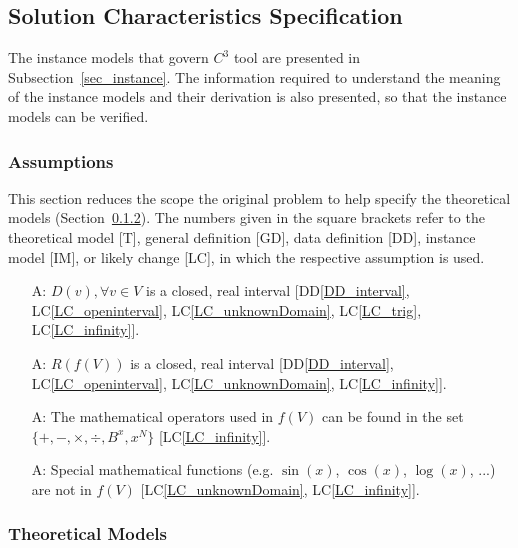 \documentclass[12pt]{article}
\newcommand{\ddref}[1]{DD\ref{#1}}
\newcounter{assumpnum} %
\newcommand{\lcref}[1]{LC\ref{#1}}
\newcommand{\prognameAbbrv}{$C^{3}$}
\begin{document}
\subsection{Solution Characteristics Specification}
The instance models that govern \prognameAbbrv{} tool are presented in
Subsection~\ref{sec_instance}. The information required to understand the 
meaning of the instance models and their derivation is also presented, so that 
the instance models can be verified.

\subsubsection{Assumptions}
This section reduces the scope the original problem to help specify the 
theoretical models (Section~\ref{sec_theoretical}). The numbers given in the 
square brackets refer to the theoretical model [T], general definition [GD], 
data definition [DD], instance model [IM], or likely change [LC], in which the 
respective assumption is used.

\begin{itemize}

\item[A\refstepcounter{assumpnum}\theassumpnum \label{A_domain}:] $D(v), 
\forall v \in V$ is a closed, real interval [\ddref{DD_interval}, 
\lcref{LC_openinterval}, \lcref{LC_unknownDomain}, \lcref{LC_trig}, 
\lcref{LC_infinity}]. 

\item[A\refstepcounter{assumpnum}\theassumpnum \label{A_interval}:] $R(f(V))$ 
is a closed, real interval [\ddref{DD_interval}, \lcref{LC_openinterval}, 
\lcref{LC_unknownDomain}, \lcref{LC_infinity}].

\item[A\refstepcounter{assumpnum}\theassumpnum \label{A_operators}:] The 
mathematical operators used in $f(V)$ can be found in the set $\{+, -, 
\times, \div, B^x, x^N \}$ [\lcref{LC_infinity}].

\item[A\refstepcounter{assumpnum}\theassumpnum \label{A_commonfunctions}:] 
Special mathematical functions (e.g. $\sin(x)$, $\cos(x)$, $\log(x)$, ...) are 
not in $f(V)$ [\lcref{LC_unknownDomain}, \lcref{LC_infinity}].

\end{itemize}

\subsubsection{Theoretical Models}\label{sec_theoretical}
\end{document}
